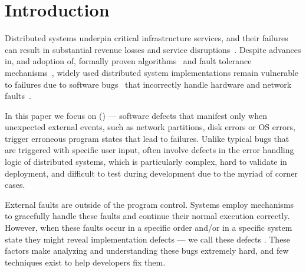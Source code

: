 \section{Introduction}

Distributed systems underpin critical infrastructure services, and their failures can result in substantial revenue losses and service disruptions~\cite{googleoutage, spotifyoutage, openaioutage}.
Despite advances in, and adoption of, formally proven algorithms~\cite{tla+microsoft} and fault tolerance mechanisms~\cite{avizienis2001fundamental,bft_survey}, widely used distributed system implementations remain vulnerable to failures due to software bugs~\cite{bugsIT} that incorrectly handle hardware and network faults~\cite{incidents1,incidents2}.

In this paper we focus on \efibitalic (\efibshort) --- software defects that manifest only when unexpected external events, such as network partitions, disk errors or OS errors, trigger erroneous program states that lead to failures.
Unlike typical bugs that are triggered with specific user input, \efibshort often involve defects in the error handling logic of distributed systems, which is particularly complex, hard to validate in deployment, and difficult to test during development due to the myriad of corner cases.


External faults are outside of the program control.
Systems employ mechanisms to gracefully handle these faults and continue their normal execution correctly.
However, when these faults occur in a specific order and/or in a specific system state they might reveal implementation defects --- we call these defects \efibshort.
These factors make analyzing and understanding these bugs extremely hard, and few techniques exist to help developers fix them.


